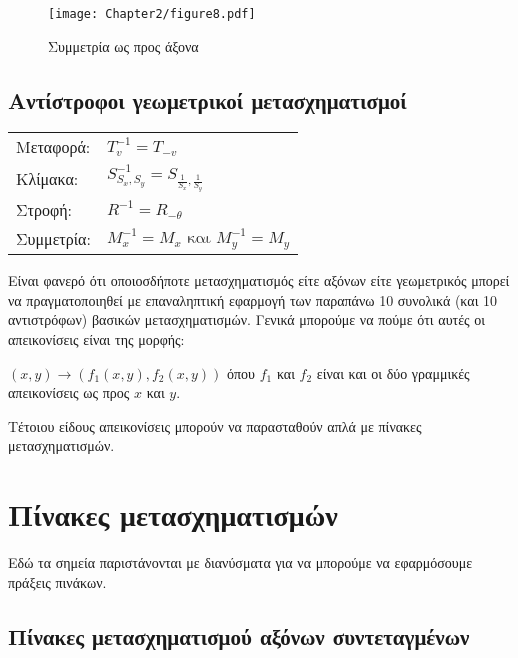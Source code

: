 \begin{figure}[h!]
	\begin{center}
	    \texttt{[image: Chapter2/figure8.pdf]}
	\end{center}
	\caption{Συμμετρία ως προς άξονα}
\end{figure}

\subsection{ Αντίστροφοι γεωμετρικοί μετασχηματισμοί}
\begin{tabular}{m{}m{}}
Μεταφορά: & \( T_v^{-1} = T_{-v} \)\\
Κλίμακα:& \( S_{S_x,S_y}^{-1} = S_{\frac{1}{S_x},\frac{1}{S_y}} \)\\
Στροφή:& \( R^{-1} = R_{-\theta} \)  \\
Συμμετρία:& \( M_x^{-1} = M_x \text{ και } M_y^{-1} = M_y \)
\end{tabular}

Είναι φανερό ότι οποιοσδήποτε μετασχηματισμός είτε αξόνων είτε γεωμετρικός μπορεί να πραγματοποιηθεί με επαναληπτική εφαρμογή των παραπάνω 10 συνολικά (και 10 αντιστρόφων) βασικών μετασχηματισμών. Γενικά μπορούμε να πούμε ότι αυτές οι απεικονίσεις είναι της μορφής:

$(x,y) \to (f_1(x,y),f_2(x,y))$ όπου $f_1$ και $f_2$ είναι και οι δύο γραμμικές απεικονίσεις ως προς $x$ και $y$.


 Τέτοιου είδους απεικονίσεις μπορούν να παρασταθούν απλά με πίνακες μετασχηματισμών.

\section{Πίνακες μετασχηματισμών}

 Εδώ τα σημεία παριστάνονται με διανύσματα για να μπορούμε να εφαρμόσουμε πράξεις πινάκων.

\subsection{Πίνακες μετασχηματισμού αξόνων συντεταγμένων}

